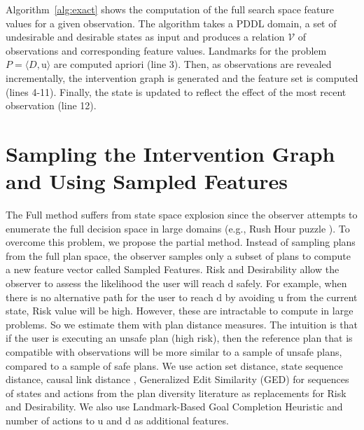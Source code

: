 \documentclass[letterpaper]{article}
\theoremstyle{plain}
\begin{document}
Algorithm~\ref{alg:exact} shows the computation of the full search space feature values for a given observation. The algorithm takes a PDDL domain, a set of undesirable and desirable states as input and produces a relation $\mathcal{V}$ of observations and corresponding feature values. Landmarks for the problem $P = \langle D, \mathrm{u}\rangle$ are computed apriori (line 3). Then, as observations are revealed incrementally, the intervention graph is generated and the feature set is computed (lines 4-11). Finally, the state is updated to reflect the effect of the most recent observation (line 12).

\section{Sampling the Intervention Graph and Using Sampled Features}
The Full method suffers from state space explosion since the observer attempts to enumerate the full decision space in large domains (e.g., Rush Hour puzzle \cite{fernau2003}). To overcome this problem, we propose the partial method. Instead of sampling plans from the full plan space, the observer samples only a subset of plans to compute a new feature vector called Sampled Features.
Risk and Desirability allow the observer to assess the likelihood the user will reach $\mathrm{d}$ safely. For example, when there is no alternative path for the user to reach $\mathrm{d}$ by avoiding $\mathrm{u}$ from the current state, Risk value will be high. However, these are intractable to compute in large problems. So we estimate them with plan distance measures. The intuition is that if the user is executing an unsafe plan (high risk), then the reference plan that is compatible with observations will be more similar to a sample of unsafe plans, compared to a sample of safe plans. We use action set distance, state sequence distance, causal link distance \cite{nguyen2012generating}, Generalized Edit Similarity (GED) for sequences of states and actions \cite{sohrabi2016finding} from the plan diversity literature as replacements for Risk and Desirability. We also use Landmark-Based Goal Completion Heuristic \cite{pereira2017} and number of actions to $\mathrm{u}$ and $\mathrm{d}$ as additional features.
\end{document}
